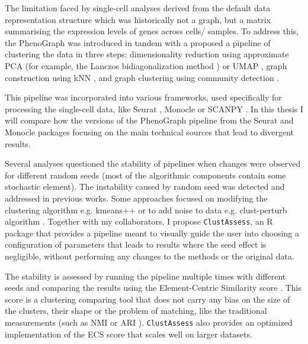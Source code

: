 The limitation faced by single-cell analyses derived from the default data representation structure which was historically not a graph, but a matrix summarising the expression levels of genes across cells/ samples. To address this, the PhenoGraph \cite{Levine2015} was introduced in tandem with a proposed a pipeline of clustering the data in three steps: dimensionality reduction using approximate PCA (for example, the Lanczos bidiagonalization method \cite{Baglama2016IRLBAFP}) or UMAP \cite{mcinnes2018uniform}, graph construction using kNN \cite{Xu2015}, and graph clustering using community detection \cite{Girvan2002}.

This pipeline was incorporated into various frameworks, used specifically for processing the single-cell data, like Seurat \cite{Hao2021}, Monocle \cite{Cao2019} or SCANPY \cite{Wolf2018}. In this thesis I will compare how the versions of the PhenoGraph pipeline from the Seurat and Monocle packages focusing on the main technical sources that lead to divergent results.

Several analyses questioned the stability of pipelines when changes were observed for different random seeds (most of the algorithmic components contain some stochastic element). The instability caused by random seed was detected and addressed in previous works. Some approaches focused on modifying the clustering algorithm e.g. kmeans++ \cite{kmeanspp} or to add noise to data e.g. clust-perturb algorithm \cite{STACEY2021}. Together with my collaborators, I propose \verb|ClustAssess|, an R package that provides a pipeline meant to visually guide the user into choosing a configuration of parameters that leads to results where the seed effect is negligible, without performing any changes to the methods or the original data.

The stability is assessed by running the pipeline multiple times with different seeds and comparing the results using the Element-Centric Similarity score \cite{Gates2019}. This score is a clustering comparing tool that does not carry any bias on the size of the clusters, their shape or the problem of matching, like the traditional measurements (such as NMI \cite{McDaid2015} or ARI \cite{Collins1988}). \verb|ClustAssess| also provides an optimized implementation of the ECS score that scales well on larger datasets.

